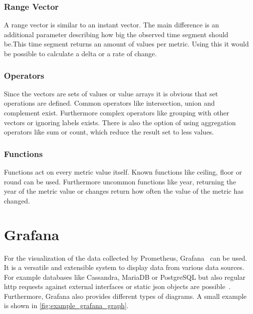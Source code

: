\subsubsection{Range Vector}

A range vector is similar to an instant vector. The main difference is an additional parameter describing how big the observed time segment should be.This time segment returns an amount of values per metric. Using this it would be possible to calculate a delta or a rate of change.

\subsubsection{Operators}

Since the vectors are sets of values or value arrays it is obvious that set operations are defined. Common operators like intersection, union and complement exist. Furthermore complex operators like grouping with other vectors or ignoring labels exists. There is also the option of using aggregation operators like sum or count, which reduce the result set to less values.

\subsubsection{Functions}

Functions act on every metric value itself. Known functions like ceiling, floor or round can be used. Furthermore uncommon functions like year, returning the year of the metric value or changes return how often the value of the metric has changed.

\section{Grafana}
\label{sec:grafana}

For the visualization of the data collected by Prometheus, Grafana~\citep{GrafanaHomepage} can be used. It is a versatile and extensible system to display data from various data sources. For example databases like Cassandra, MariaDB or PostgreSQL but also regular \gls{http} requests against external interfaces or static \gls{json} objects are possible~\cite{GrafanaDataSources}. Furthermore, Grafana also provides different types of diagrams. A small example is shown in \cref{fig:example_grafana_graph}.

